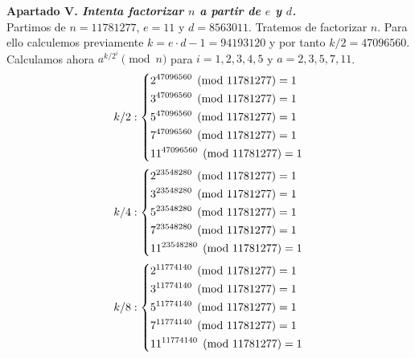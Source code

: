 \documentclass[fleqn]{article}
\begin{document}
    \newpage
    \textbf{Apartado V. \textit{Intenta factorizar $n$ a partir de $e$ y $d$.}}\\ 
    Partimos de $n = 11781277$, $e = 11$ y $d = 8563011$. Tratemos de factorizar $n$. Para ello calculemos previamente 
    $k = e \cdot d - 1 = 94193120$ y por tanto $k/2 = 47096560$. Calculamos ahora
    $a^{k/2^i} \pmod{n}$ para $i = 1, 2, 3, 4, 5$ y $a = 2, 3, 5, 7, 11$.
    \begin{equation*}k/2: \left\{\\
        \begin{aligned}
            &2^{47096560} \pmod{11781277} = 1 \\
            &3^{47096560} \pmod{11781277} = 1 \\
            &5^{47096560} \pmod{11781277} = 1 \\
            &7^{47096560} \pmod{11781277} = 1 \\
            &11^{47096560} \pmod{11781277} = 1 \\
        \end{aligned} \right.
    \end{equation*}
    \begin{equation*}
        k/4: \left\{ \\
        \begin{aligned}
            &2^{23548280} \pmod{11781277} = 1 \\
            &3^{23548280} \pmod{11781277} = 1 \\
            &5^{23548280} \pmod{11781277} = 1 \\
            &7^{23548280} \pmod{11781277} = 1 \\
            &11^{23548280} \pmod{11781277} = 1 \\
        \end{aligned} \right.
    \end{equation*}
    \begin{equation*}
        k/8: \left\{ \\
        \begin{aligned}
            &2^{11774140} \pmod{11781277} = 1 \\
            &3^{11774140} \pmod{11781277} = 1 \\
            &5^{11774140} \pmod{11781277} = 1 \\
            &7^{11774140} \pmod{11781277} = 1 \\
            &11^{11774140} \pmod{11781277} = 1 \\
        \end{aligned} \right. 
    \end{equation*}
\end{document}
